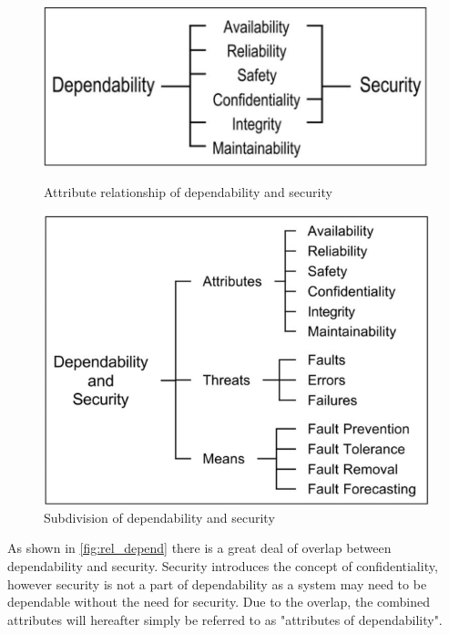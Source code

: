 \begin{figure}[ht]
  \begin{minipage}[b]{0.45\textwidth}
    \centering
    \includegraphics[width=1\textwidth]{graphics/depend2.png}
    \caption{Attribute relationship of dependability and security \autocite{rts_depend}}
    \label{fig:rel_depend}
  \end{minipage}
  \hspace{0.5cm}
  \begin{minipage}[b]{0.45\textwidth}
    \centering
    \includegraphics[width=1\textwidth]{graphics/depend.png}
    \caption{Subdivision of dependability and security \autocite{rts_depend}}
    \label{fig:sub_depend}
  \end{minipage}
\end{figure} 

As shown in \cref{fig:rel_depend} there is a great deal of overlap between dependability and security. 
Security introduces the concept of confidentiality, however security is not a part of dependability as a system may need to be dependable without the need for security.
Due to the overlap, the combined attributes will hereafter simply be referred to as "attributes of dependability".

